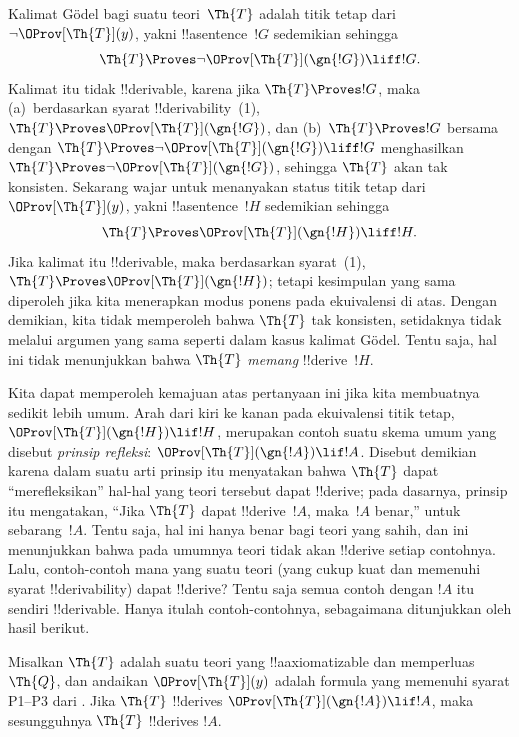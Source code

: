 \documentclass[../../../include/open-logic-section]{subfiles}
\begin{document}


Kalimat G\"odel bagi suatu teori~$\Th{T}$ adalah titik tetap dari
$\lnot \OProv[\Th{T}](y)$, yakni !!a{sentence}~$!G$ sedemikian sehingga
\[
\Th{T} \Proves \lnot \OProv[\Th{T}](\gn{!G}) \liff !G.
\]
Kalimat itu tidak !!{derivable}, karena jika $\Th{T} \Proves !G$, maka
(a)~berdasarkan syarat !!{derivability}~(1),
$\Th{T} \Proves \OProv[\Th{T}](\gn{!G})$, dan (b)~$\Th{T} \Proves !G$
bersama dengan
$\Th{T} \Proves \lnot \OProv[\Th{T}](\gn{!G}) \liff !G$ menghasilkan
$\Th{T} \Proves \lnot \OProv[\Th{T}](\gn{!G})$, sehingga $\Th{T}$ akan
tak konsisten. Sekarang wajar untuk menanyakan status titik tetap dari
$\OProv[\Th{T}](y)$, yakni !!a{sentence}~$!H$ sedemikian sehingga
\[
\Th{T} \Proves \OProv[\Th{T}](\gn{!H}) \liff !H.
\]
Jika kalimat itu !!{derivable}, maka berdasarkan syarat~(1),
$\Th{T} \Proves \OProv[\Th{T}](\gn{!H})$; tetapi kesimpulan yang sama
diperoleh jika kita menerapkan modus ponens pada ekuivalensi di atas. Dengan
demikian, kita tidak memperoleh bahwa $\Th{T}$ tak konsisten, setidaknya
tidak melalui argumen yang sama seperti dalam kasus kalimat G\"odel. Tentu saja,
hal ini tidak menunjukkan bahwa $\Th{T}$ \emph{memang} !!{derive}~$!H$.

Kita dapat memperoleh kemajuan atas pertanyaan ini jika kita membuatnya
sedikit lebih umum. Arah dari kiri ke kanan pada ekuivalensi titik tetap,
$\OProv[\Th{T}](\gn{!H}) \lif !H$, merupakan contoh suatu skema umum yang
disebut \emph{prinsip refleksi}: $\OProv[\Th{T}](\gn{!A}) \lif !A$.
Disebut demikian karena dalam suatu arti prinsip itu menyatakan bahwa
$\Th{T}$ dapat ``merefleksikan'' hal-hal yang teori tersebut dapat
!!{derive}; pada dasarnya, prinsip itu mengatakan, ``Jika $\Th{T}$ dapat
!!{derive}~$!A$, maka~$!A$ benar,'' untuk sebarang~$!A$. Tentu saja, hal ini
hanya benar bagi teori yang sahih, dan ini menunjukkan bahwa pada umumnya
teori tidak akan !!{derive} setiap contohnya. Lalu, contoh-contoh mana yang
suatu teori (yang cukup kuat dan memenuhi syarat
!!{derivability}) dapat !!{derive}? Tentu saja semua contoh dengan $!A$
itu sendiri !!{derivable}. Hanya itulah contoh-contohnya, sebagaimana ditunjukkan oleh hasil
berikut.

\begin{thm}
Misalkan $\Th{T}$ adalah suatu teori yang !!a{axiomatizable} dan memperluas
$\Th{Q}$, dan andaikan $\OProv[\Th{T}](y)$ adalah formula yang memenuhi
syarat P1--P3 dari . Jika $\Th{T}$ !!{derive}s
$\OProv[\Th{T}](\gn{!A}) \lif !A$, maka sesungguhnya $\Th{T}$ !!{derive}s
$!A$.
\end{thm}
\end{document}
